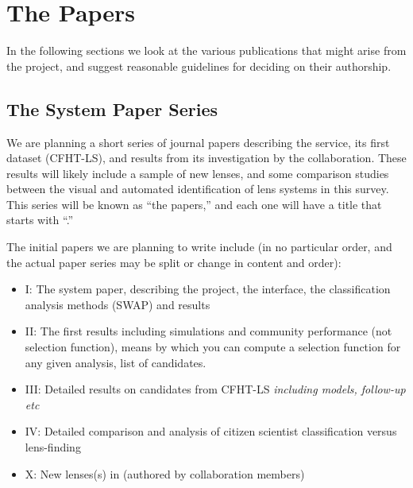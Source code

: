 \documentclass[a4paper]{article}
\begin{document}




\section{The \SW Papers}

In the following sections we look at the various publications that might
arise from the \sw project, and suggest reasonable guidelines for
deciding on their authorship. 

\subsection{The \sw System Paper Series}
\label{sec:series}

We are planning a short series of journal papers describing the \sw service, its
first dataset (CFHT-LS), and results from its investigation by the
collaboration. These results will likely include a sample of new lenses,
and some comparison studies between the visual and automated
identification of lens systems in this survey. This series will be known
as ``the \sw papers,'' and each one will have a title that starts with ``\sw.''

The initial papers we are planning to write include (in no particular order, and the actual paper series may be split or change in content and order):

\begin{itemize}
\item \sw I: The system paper, describing the project, the interface, the classification analysis methods (SWAP) and results 
\item \sw II: The \sw  first results including simulations and community performance (not selection function), means by which you can compute a selection function for any given analysis, list of candidates. 
\item \sw III: Detailed results on candidates from CFHT-LS \textit{including models, follow-up etc}
\item \sw IV: Detailed comparison and analysis of citizen scientist classification versus lens-finding
\item \sw X: New lenses(s) in \sw (authored by collaboration members)
\end{itemize}
\end{document}
